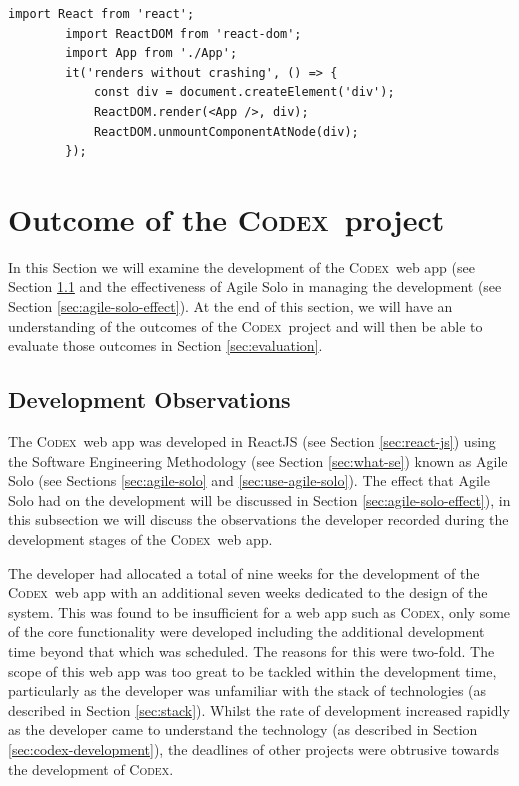 \documentclass[final]{cmpreport}
\newcommand{\Codex}{\textsc{Codex}}
\begin{document}
		\begin{lstlisting}[caption={\Codex \ web app smoke test}, label={cod:smoke-test}]
		import React from 'react';
		import ReactDOM from 'react-dom';
		import App from './App';
		it('renders without crashing', () => {
			const div = document.createElement('div');
			ReactDOM.render(<App />, div);
			ReactDOM.unmountComponentAtNode(div);
		});
		\end{lstlisting}
	
	
	\section{Outcome of the \Codex \ project} \label{sec:outcomes}
	In this Section we will examine the development of the \Codex \ web app (see Section \ref{sec:dev-obs} and the effectiveness of Agile Solo in managing the development (see Section \ref{sec:agile-solo-effect}). At the end of this section, we will have an understanding of the outcomes of the \Codex \ project and will then be able to evaluate those outcomes in Section \ref{sec:evaluation}.
	
		\subsection{Development Observations} \label{sec:dev-obs}
		The \Codex \ web app was developed in ReactJS (see Section \ref{sec:react-js}) using the Software Engineering Methodology (see Section \ref{sec:what-se}) known as Agile Solo (see Sections \ref{sec:agile-solo} and \ref{sec:use-agile-solo}). The effect that Agile Solo had on the development will be discussed in Section \ref{sec:agile-solo-effect}), in this subsection we will discuss the observations the developer recorded during the development stages of the \Codex \ web app. 
		
		The developer had allocated a total of nine weeks for the development of the \Codex \ web app with an additional seven weeks dedicated to the design of the system. This was found to be insufficient for a web app such as \Codex, only some of the core functionality were developed including the additional development time beyond that which was scheduled. The reasons for this were two-fold. The scope of this web app was too great to be tackled within the development time, particularly as the developer was unfamiliar with the stack of technologies (as described in Section \ref{sec:stack}). Whilst the rate of development increased rapidly as the developer came to understand the technology (as described in Section \ref{sec:codex-development}), the deadlines of other projects were obtrusive towards the development of \Codex. 
		
\end{document}
